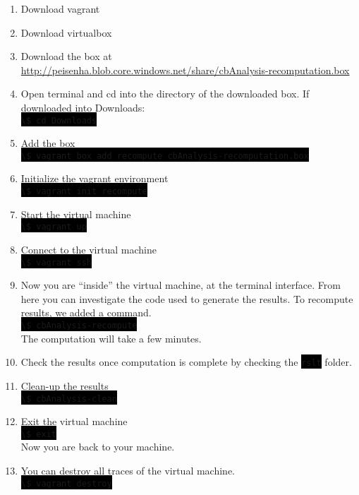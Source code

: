 \documentclass{article}
\newcommand{\inlineterminal}[1]{\colorbox{black}{\lstinline[basicstyle=\ttfamily\color{white}]|#1|}}
\begin{document}
    \begin{enumerate}[itemsep=10pt,parsep=2pt]
        \item Download vagrant
        \item Download virtualbox
        \item Download the box at \url{http://peisenha.blob.core.windows.net/share/cbAnalysis-recomputation.box}
        \item Open terminal and cd into the directory of the downloaded box. If downloaded
        into Downloads: \hfill \\ 

        \inlineterminal{\$ cd Downloads}
        \item Add the box \hfill \\

        \inlineterminal{\$ vagrant box add recompute cbAnalysis-recomputation.box}
        \item Initialize the vagrant environment \hfill \\

        \inlineterminal{\$ vagrant init recompute}
        \item Start the virtual machine \hfill \\

        \inlineterminal{\$ vagrant up}
        \item Connect to the virtual machine \hfill \\
        
        \inlineterminal{\$ vagrant ssh}
        \item Now you are ``inside'' the virtual machine, at the terminal interface. From
        here you can investigate the code used to generate the results. To recompute
        results, we added a command. \hfill \\
        
        \inlineterminal{\$ cbAnalysis-recompute} \hfill \\

        The computation will take a few minutes.
        \item Check the results once computation is complete by checking
        the \inlineterminal{rslt} folder.
        \item Clean-up the results \hfill \\
        
        \inlineterminal{\$ cbAnalysis-clean}

        \item Exit the virtual machine \hfill \\

        \inlineterminal{\$ exit} \hfill \\

        Now you are back to your machine.

        \item You can destroy all traces of the virtual machine. \hfill \\

        \inlineterminal{\$ vagrant destroy}
    \end{enumerate}
\end{document}
